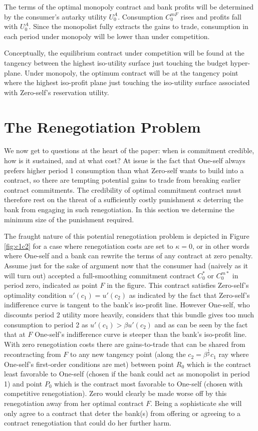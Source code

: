 \documentclass[11pt,english]{article}
\theoremstyle{plain}
\theoremstyle{definition}
\begin{document}
The terms of the optimal monopoly contract and bank profits will be determined by the consumer's autarky
utility $U_{0}^{A}$. Consumption $C_{0}^{mF}$ rises and profits fall with $U_{0}^{A}$.
Since the monopolist fully extracts the gains to trade, consumption in
each period under monopoly will be lower than under competition. 

Conceptually,  the equilibrium contract under competition will be found
at the tangency between the highest iso-utility surface just touching
the budget hyper-plane. Under monopoly, the optimum contract will
be at the tangency point where the highest iso-profit plane just touching the iso-utility surface associated with Zero-self's reservation
utility.

\section{The Renegotiation Problem}\label{renegotiation}

We now get to questions at the heart of the paper: when is commitment
credible, how is it sustained, and at what cost? At issue is the fact
that One-self always prefers higher period 1 consumption than what Zero-self
wants to build into a contract, so there are tempting potential
gains to trade from breaking earlier contract commitments. The credibility
of optimal commitment contract must therefore rest on the threat
of a sufficiently costly punishment $\kappa$ deterring the bank from engaging
in such renegotiation. In this section we determine the minimum size
of the punishment required.

The fraught nature of this potential renegotiation problem
is depicted in Figure \ref{fig:c1c2} for a case where renegotiation
costs are set to $\kappa=0$, or in other words where One-self and a bank
can rewrite the terms of any contract at zero penalty. Assume \textendash{}
just for the sake of argument now \textendash{} that the consumer
had (naively as it will turn out) accepted a full-smoothing commitment
contract $C_{0}^{*}$ or $C_{0}^{m*}$ in period zero, indicated as
point $F$ in the figure. This contract satisfies Zero-self's optimality
condition $u'(c_{1})=u'(c_{2})$ as indicated by the fact that Zero-self's
indifference curve is tangent to the bank's iso-profit line. However One-self, who discounts period 2 utility more heavily, considers that this bundle gives too much consumption to period 2  as $u'(c_{1})>\beta u'(c_{2})$ and as can
be seen by the fact that at $F$ One-self's indifference curve is
steeper than the bank's iso-profit line. With zero renegotiation costs
there are gains-to-trade that can be shared from recontracting from
$F$ to any new tangency point (along the $c_{2}=\beta^{\frac{1}{\rho}}c_{1}$
ray where One-self's first-order conditions are met) between point
$R_{0}$ which is the contract least favorable to One-self (chosen if
the bank could act as monopolist in period 1) and point $P_{0}$ which
is the contract most favorable to One-self (chosen with competitive
renegotiation). Zero would clearly be made  worse off by this  renegotiation
away from her optimal contract $F$. Being a sophisticate she will only agree to a contract that deter the bank(s) from offering or agreeing to a contract renegotiation that could do her further harm.     
\end{document}
